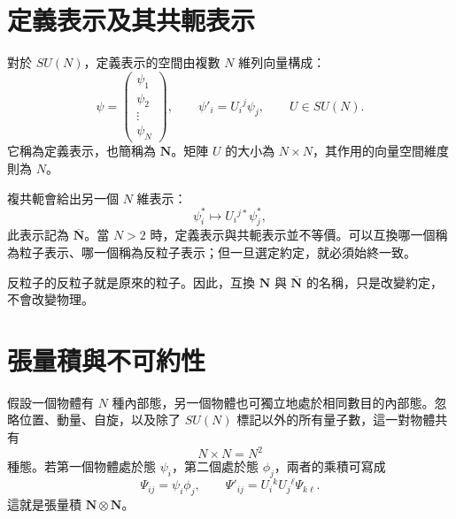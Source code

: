 \section{定義表示及其共軛表示}

對於 \(SU(N)\)，定義表示的空間由複數 \(N\) 維列向量構成：
\begin{equation}
\psi=
\begin{pmatrix}
\psi_1\\
\psi_2\\
\vdots\\
\psi_N
\end{pmatrix},
\qquad
\psi'_i=U_i{}^j\psi_j,
\qquad
U\in SU(N).
\label{eq:l10-defining}
\end{equation}
它稱為定義表示，也簡稱為 \(\mathbf N\)。矩陣 \(U\) 的大小為 \(N\times N\)，其作用的向量空間維度則為 \(N\)。

複共軛會給出另一個 \(N\) 維表示：
\begin{equation}
\psi_i^*\longmapsto U_i{}^{j*}\psi_j^*,
\label{eq:l10-conjugate}
\end{equation}
此表示記為 \(\overline{\mathbf N}\)。當 \(N>2\) 時，定義表示與共軛表示並不等價。可以互換哪一個稱為粒子表示、哪一個稱為反粒子表示；但一旦選定約定，就必須始終一致。

\begin{classroomqa}
\end{classroomqa}

反粒子的反粒子就是原來的粒子。因此，互換 \(\mathbf N\) 與 \(\overline{\mathbf N}\) 的名稱，只是改變約定，不會改變物理。

\section{張量積與不可約性}

假設一個物體有 \(N\) 種內部態，另一個物體也可獨立地處於相同數目的內部態。忽略位置、動量、自旋，以及除了 \(SU(N)\) 標記以外的所有量子數，這一對物體共有
\begin{equation}
N\times N=N^2
\label{eq:l10-product-count}
\end{equation}
種態。若第一個物體處於態 \(\psi_i\)，第二個處於態 \(\phi_j\)，兩者的乘積可寫成
\begin{equation}
\Psi_{ij}=\psi_i\phi_j,
\qquad
\Psi'_{ij}=U_i{}^kU_j{}^\ell\Psi_{k\ell}.
\label{eq:l10-tensor-transform}
\end{equation}
這就是張量積 \(\mathbf N\otimes\mathbf N\)。


